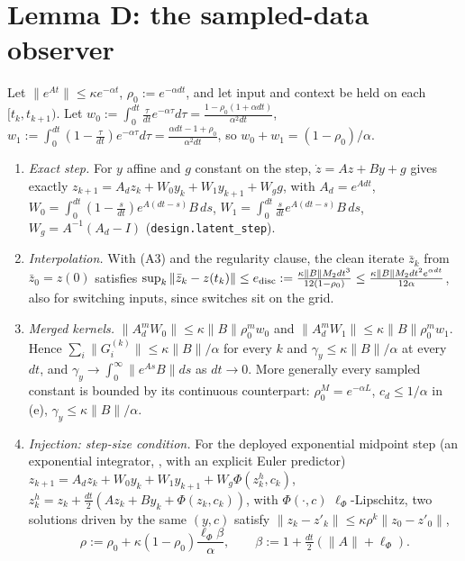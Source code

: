 \section{Lemma D: the sampled-data observer}

\begin{lemma}[Lemma D]\label{lem:D}
Let $\|e^{At}\|\le\kappa e^{-\alpha t}$, $\rho_0:=e^{-\alpha dt}$, and let input and context be held on
each $[t_k,t_{k+1})$. Let
$w_0:=\int_0^{dt}\tfrac{\tau}{dt}e^{-\alpha\tau}d\tau=\frac{1-\rho_0(1+\alpha dt)}{\alpha^2dt}$,
$w_1:=\int_0^{dt}(1-\tfrac\tau{dt})e^{-\alpha\tau}d\tau=\frac{\alpha dt-1+\rho_0}{\alpha^2dt}$, so
$w_0+w_1=(1-\rho_0)/\alpha$.
\begin{enumerate}[label=(\alph*)]
\item \emph{Exact step.} For $y$ affine and $g$ constant on the step, $\dot z=Az+By+g$ gives exactly
$z_{k+1}=A_dz_k+W_0y_k+W_1y_{k+1}+W_gg$, with $A_d=e^{Adt}$,
$W_0=\int_0^{dt}(1-\tfrac s{dt})e^{A(dt-s)}B\,ds$, $W_1=\int_0^{dt}\tfrac s{dt}e^{A(dt-s)}B\,ds$,
$W_g=A^{-1}(A_d-I)$ (\texttt{design.latent\_step}).
\item \emph{Interpolation.} With (A3) and the regularity clause, the clean iterate $\bar z_k$ from
$\bar z_0=z(0)$ satisfies
$\sup_k\|\bar z_k-z(t_k)\|\le e_{\rm disc}:=\frac{\kappa\|B\|M_2dt^3}{12(1-\rho_0)}\le\frac{\kappa\|B\|M_2dt^2e^{\alpha dt}}{12\alpha}$,
also for switching inputs, since switches sit on the grid.
\item \emph{Merged kernels.} $\|A_d^mW_0\|\le\kappa\|B\|\rho_0^mw_0$ and $\|A_d^mW_1\|\le\kappa\|B\|\rho_0^mw_1$. Hence
$\sum_i\|G^{(k)}_i\|\le\kappa\|B\|/\alpha$ for every $k$ and $\gamma_y\le\kappa\|B\|/\alpha$ at every $dt$, and
$\gamma_y\to\int_0^\infty\|e^{As}B\|ds$ as $dt\to0$. More generally every sampled constant is bounded by its
continuous counterpart: $\rho_0^M=e^{-\alpha L}$, $c_d\le1/\alpha$ in (e), $\gamma_y\le\kappa\|B\|/\alpha$.
\item \emph{Injection: step-size condition.} For the deployed exponential midpoint step (an
exponential integrator, \citealp{hochbruck2010exponential}, with an explicit Euler predictor)
$z_{k+1}=A_dz_k+W_0y_k+W_1y_{k+1}+W_g\Phi(z^h_k,c_k)$, $z^h_k=z_k+\tfrac{dt}2(Az_k+By_k+\Phi(z_k,c_k))$,
with $\Phi(\cdot,c)$ $\ell_\Phi$-Lipschitz, two solutions driven by the same $(y,c)$ satisfy
$\|z_k-z'_k\|\le\kappa\rho^k\|z_0-z'_0\|$,
\[
\rho:=\rho_0+\kappa(1-\rho_0)\frac{\ell_\Phi\beta}{\alpha},\qquad\beta:=1+\tfrac{dt}2(\|A\|+\ell_\Phi).
\]
\end{enumerate}
\end{lemma}
